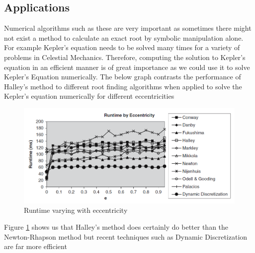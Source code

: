 \subsection{Applications}
Numerical algorithms such as these are very important as sometimes there might not exist a method to calculate an exact root by symbolic manipulation alone.
\newline For example Kepler's equation needs to be solved many times for a variety of problems in Celestial Mechanics\cite{Fein}. Therefore, computing the solution to Kepler's equation in an efficient manner
is of great importance as we could use it to solve Kepler's Equation numerically\cite{Fein}. The below graph contrasts the performance of Halley's method to different root finding algorithms when
applied to solve the Kepler's equation numerically for different eccentricities \cite{Fein}

\begin{figure}[h]
        \begin{center}
                \includegraphics[scale=0.4]{me20b050.png}
        \end{center}
        \caption{Runtime varying with eccentricity}
        \label{fig: runtime}
\end{figure}

Figure \ref{fig: runtime} shows us that Halley's method does certainly do better than the Newton-Rhapson method but recent techniques such as Dynamic Discretization are far more efficient

